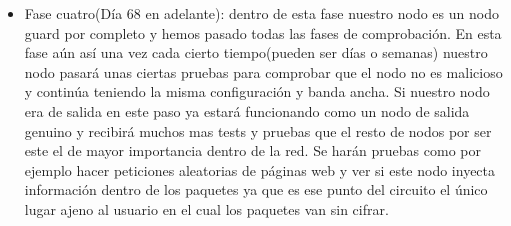 \begin{itemize}
	\item Fase cuatro(Día 68 en adelante): dentro de esta fase nuestro nodo es un nodo guard por completo y hemos pasado todas las fases de comprobación. En esta fase aún así una vez cada cierto tiempo(pueden ser días o semanas) nuestro nodo pasará unas ciertas pruebas para comprobar que el nodo no es malicioso y continúa teniendo la misma configuración y banda ancha. Si nuestro nodo era de salida en este paso ya estará funcionando como un nodo de salida genuino y recibirá muchos mas tests y pruebas que el resto de nodos por ser este el de mayor importancia dentro de la red. Se harán pruebas como por ejemplo hacer peticiones aleatorias de páginas web y ver si este nodo inyecta información dentro de los paquetes ya que es ese punto del circuito el único lugar ajeno al usuario en el cual los paquetes van sin cifrar.
\end{itemize}